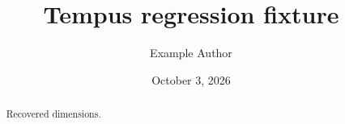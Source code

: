 \documentclass{tempusreport}
\title{Tempus regression fixture}
\author{Example Author}\date{October 3, 2026}
\begin{document}
\maketitle
\begin{abstract}Recovered dimensions.\end{abstract}
\end{document}
